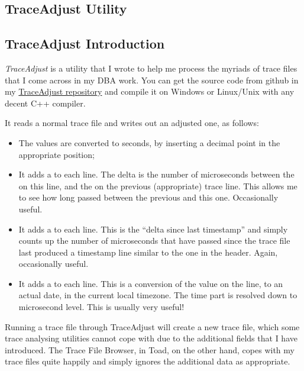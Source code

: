 \begin{appendix}
\chapter{TraceAdjust Utility}
\label{traceadjust}

\section*{TraceAdjust Introduction}\label{traceadjust-introduction}


\emph{TraceAdjust} is a utility that I wrote to help me process the
myriads of trace files that I come across in my DBA work. You can get
the source code from github in my 
\href{https://github.com/NormanDunbar/TraceAdjust}{TraceAdjust repository} and compile it
on Windows or Linux/Unix with any decent C++ compiler.

It reads a normal trace file and writes out an adjusted one, as follows:

\begin{itemize}
\tightlist
\item
  The  values are converted to seconds, by inserting a
  decimal point in the appropriate position;
\item
  It adds a  to each  line. The delta is
  the number of microseconds between the  on this line,
  and the  on the previous (appropriate) trace line. This
  allows me to see how long passed between the previous 
  and this one. Occasionally useful.
\item
  It adds a  to each  line. This is the
  ``delta since last timestamp'' and simply counts up the number of
  microseconds that have passed since the trace file last produced a
  timestamp line similar to the one in the header. Again, occasionally
  useful.
\item
  It adds a  to each  line. This is a
  conversion of the  value on the line, to an actual
  date, in the current local timezone. The time part is resolved down to
  microsecond level. This is usually very useful!
\end{itemize}

Running a trace file through TraceAdjust will create a new trace file,
which some trace analysing utilities cannot cope with due to the
additional fields that I have introduced. The Trace File Browser, in
Toad, on the other hand, copes with my trace files quite happily and
simply ignores the additional data as appropriate.


\end{appendix}
